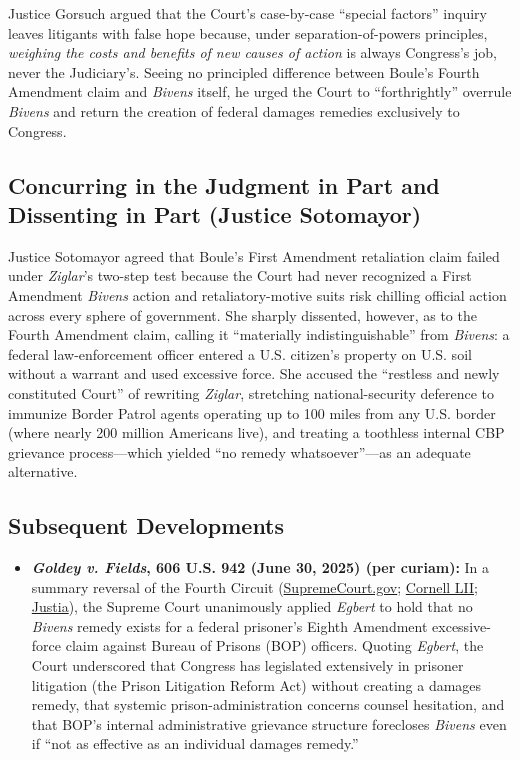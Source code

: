 \documentclass[12pt]{article}
\begin{document}
Justice Gorsuch argued that the Court's case-by-case ``special factors'' inquiry leaves litigants with false hope because, under separation-of-powers principles, \textit{weighing the costs and benefits of new causes of action} is always Congress's job, never the Judiciary's. Seeing no principled difference between Boule's Fourth Amendment claim and \textit{Bivens} itself, he urged the Court to ``forthrightly'' overrule \textit{Bivens} and return the creation of federal damages remedies exclusively to Congress.

\subsection{Concurring in the Judgment in Part and Dissenting in Part (Justice Sotomayor)}

Justice Sotomayor agreed that Boule's First Amendment retaliation claim failed under \textit{Ziglar}'s two-step test because the Court had never recognized a First Amendment \textit{Bivens} action and retaliatory-motive suits risk chilling official action across every sphere of government. She sharply dissented, however, as to the Fourth Amendment claim, calling it ``materially indistinguishable'' from \textit{Bivens}: a federal law-enforcement officer entered a U.S. citizen's property on U.S. soil without a warrant and used excessive force. She accused the ``restless and newly constituted Court'' of rewriting \textit{Ziglar}, stretching national-security deference to immunize Border Patrol agents operating up to 100 miles from any U.S. border (where nearly 200 million Americans live), and treating a toothless internal CBP grievance process---which yielded ``no remedy whatsoever''---as an adequate alternative.

\subsection{Subsequent Developments}

\begin{itemize}

\item \textbf{\textit{Goldey v. Fields}, 606 U.S. 942 (June 30, 2025) (per curiam):} In a summary reversal of the Fourth Circuit (\href{https://www.supremecourt.gov/opinions/24pdf/24-809_9o6b.pdf}{SupremeCourt.gov}; \href{https://www.law.cornell.edu/supremecourt/text/24-809}{Cornell LII}; \href{https://supreme.justia.com/cases/federal/us/606/24-809/}{Justia}), the Supreme Court unanimously applied \textit{Egbert} to hold that no \textit{Bivens} remedy exists for a federal prisoner's Eighth Amendment excessive-force claim against Bureau of Prisons (BOP) officers. Quoting \textit{Egbert}, the Court underscored that Congress has legislated extensively in prisoner litigation (the Prison Litigation Reform Act) without creating a damages remedy, that systemic prison-administration concerns counsel hesitation, and that BOP's internal administrative grievance structure forecloses \textit{Bivens} even if ``not as effective as an individual damages remedy.''

\end{itemize}
\end{document}
